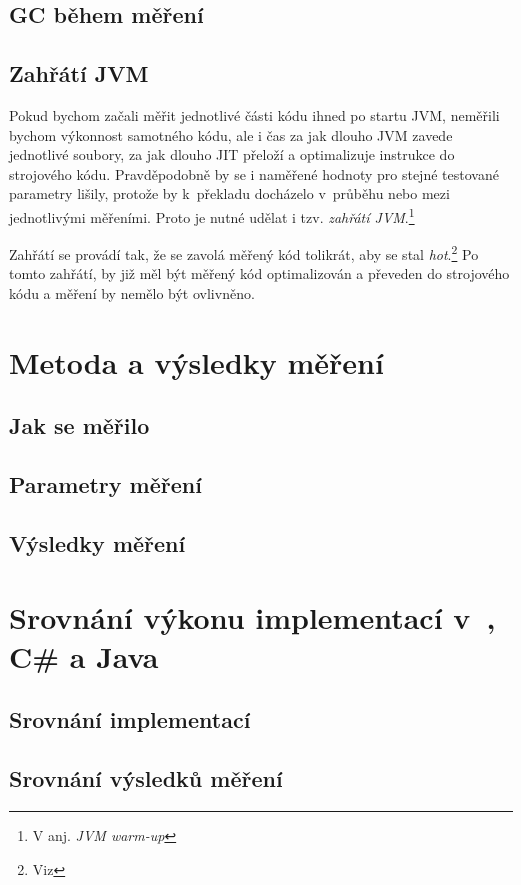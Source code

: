\subsection{GC během měření}
\subsection{Zahřátí JVM}

Pokud bychom začali měřit jednotlivé části kódu ihned po startu JVM, neměřili bychom výkonnost samotného kódu, ale i čas za jak dlouho JVM zavede jednotlivé \classfile soubory, za jak dlouho JIT přeloží a optimalizuje instrukce \bytecode{} do strojového kódu. Pravděpodobně by se i naměřené hodnoty pro stejné testované parametry lišily, protože by k~překladu docházelo v~průběhu nebo mezi jednotlivými měřeními. Proto je nutné udělat i tzv. \emph{zahřátí JVM}.\footnote{V anj. \emph{JVM warm-up}}

Zahřátí se provádí tak, že se zavolá měřený kód tolikrát, aby se stal \emph{hot}.\footnote{Viz } Po tomto zahřátí, by již měl být měřený kód optimalizován a převeden do strojového kódu a měření by nemělo být ovlivněno.

\section{Metoda a výsledky měření}
\subsection{Jak se měřilo}
\subsection{Parametry měření}
\subsection{Výsledky měření}
\section{Srovnání výkonu implementací v~{\protect \CC}, C\# a Java}
\subsection{Srovnání implementací}
\subsection{Srovnání výsledků měření}
